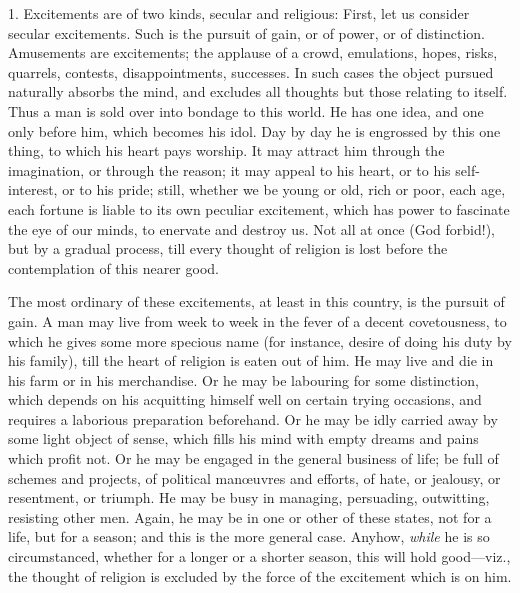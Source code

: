 1. Excitements are of two kinds, secular and religious: First, let
us consider secular excitements. Such is the pursuit of gain, or of
power, or of distinction. Amusements are excitements; the applause of
a crowd, emulations, hopes, risks, quarrels, contests,
disappointments, successes. In such cases the object pursued naturally
absorbs the mind, and excludes all thoughts but those relating to
itself. Thus a man is sold over into bondage to this world. He has one
idea, and one only before him, which becomes his idol. Day by day he
is engrossed by this one thing, to which his heart pays worship. It
may attract him through the imagination, or through the reason; it may
appeal to his heart, or to his self-interest, or to his pride; still,
whether we be young or old, rich or poor, each age, each fortune is
liable to its own peculiar excitement, which has power to fascinate
the eye of our minds, to enervate and destroy us. Not all at once (God
forbid!), but by a gradual process, till every thought of religion is
lost before the contemplation of this nearer good.

The most ordinary of these excitements, at least in this country,
is the pursuit of gain. A man may live from week to week in the fever
of a decent covetousness, to which he gives some more specious name
(for instance, desire of doing his duty by his family), till the heart
of religion is eaten out of him. He may live and die in his farm or in
his merchandise. Or he may be labouring for some distinction, which
depends on his acquitting himself well on certain trying occasions,
and requires a laborious preparation beforehand. Or he may be idly
carried away by some light object of sense, which fills his mind with
empty dreams and pains which profit not. Or he may be engaged in the
general business of life; be full of schemes and projects, of
political manœuvres and efforts, of hate, or jealousy, or resentment,
or triumph. He may be busy in managing, persuading, outwitting,
resisting other men. Again, he may be in one or other of these states,
not for a life, but for a season; and this is the more general case.
Anyhow, \emph{while} he is so circumstanced, whether for a longer or a
shorter season, this will hold good—viz., the thought of religion is
excluded by the force of the excitement which is on him.


